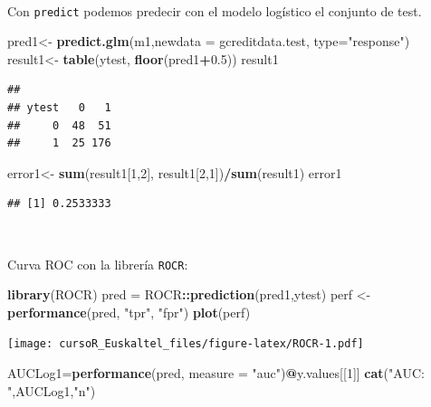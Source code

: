 \documentclass[]{book}
\newenvironment{Shaded}{\begin{snugshade}}{\end{snugshade}}
\newcommand{\KeywordTok}[1]{\textcolor[rgb]{0.13,0.29,0.53}{\textbf{#1}}}
\newcommand{\DataTypeTok}[1]{\textcolor[rgb]{0.13,0.29,0.53}{#1}}
\newcommand{\DecValTok}[1]{\textcolor[rgb]{0.00,0.00,0.81}{#1}}
\newcommand{\FloatTok}[1]{\textcolor[rgb]{0.00,0.00,0.81}{#1}}
\newcommand{\StringTok}[1]{\textcolor[rgb]{0.31,0.60,0.02}{#1}}
\newcommand{\OperatorTok}[1]{\textcolor[rgb]{0.81,0.36,0.00}{\textbf{#1}}}
\newcommand{\NormalTok}[1]{#1}
\begin{document}
~

Con \texttt{predict} podemos predecir con el modelo logístico el
conjunto de test.

\begin{Shaded}
\begin{Highlighting}[]
\NormalTok{pred1<-}\StringTok{ }\KeywordTok{predict.glm}\NormalTok{(m1,}\DataTypeTok{newdata =}\NormalTok{ gcreditdata.test, }\DataTypeTok{type=}\StringTok{"response"}\NormalTok{)}
\NormalTok{result1<-}\StringTok{ }\KeywordTok{table}\NormalTok{(ytest, }\KeywordTok{floor}\NormalTok{(pred1}\OperatorTok{+}\FloatTok{0.5}\NormalTok{))}
\NormalTok{result1}
\end{Highlighting}
\end{Shaded}

\begin{verbatim}
##      
## ytest   0   1
##     0  48  51
##     1  25 176
\end{verbatim}

\begin{Shaded}
\begin{Highlighting}[]
\NormalTok{error1<-}\StringTok{ }\KeywordTok{sum}\NormalTok{(result1[}\DecValTok{1}\NormalTok{,}\DecValTok{2}\NormalTok{], result1[}\DecValTok{2}\NormalTok{,}\DecValTok{1}\NormalTok{])}\OperatorTok{/}\KeywordTok{sum}\NormalTok{(result1)}
\NormalTok{error1}
\end{Highlighting}
\end{Shaded}

\begin{verbatim}
## [1] 0.2533333
\end{verbatim}

~

Curva ROC con la librería \texttt{ROCR}:

\begin{Shaded}
\begin{Highlighting}[]
\KeywordTok{library}\NormalTok{(ROCR)}
\NormalTok{pred =}\StringTok{ }\NormalTok{ROCR}\OperatorTok{::}\KeywordTok{prediction}\NormalTok{(pred1,ytest)}
\NormalTok{perf <-}\StringTok{ }\KeywordTok{performance}\NormalTok{(pred, }\StringTok{"tpr"}\NormalTok{, }\StringTok{"fpr"}\NormalTok{)}
\KeywordTok{plot}\NormalTok{(perf)}
\end{Highlighting}
\end{Shaded}

\texttt{[image: cursoR\_Euskaltel\_files/figure-latex/ROCR-1.pdf]}

\begin{Shaded}
\begin{Highlighting}[]
\NormalTok{AUCLog1=}\KeywordTok{performance}\NormalTok{(pred, }\DataTypeTok{measure =} \StringTok{"auc"}\NormalTok{)}\OperatorTok{@}\NormalTok{y.values[[}\DecValTok{1}\NormalTok{]]}
\KeywordTok{cat}\NormalTok{(}\StringTok{"AUC: "}\NormalTok{,AUCLog1,}\StringTok{"n"}\NormalTok{)}
\end{Highlighting}
\end{Shaded}
\end{document}
